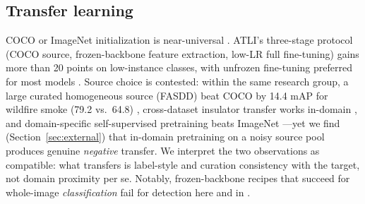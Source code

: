 \documentclass[conference]{IEEEtran}
\begin{document}
\subsection{Transfer learning}
COCO \cite{lin2014coco} or ImageNet initialization is near-universal \cite{miao2019insulator,lei2019faultdetection,qiu2022lightweightyolov4,yuan2023yolov5tl,maduako2022felect,zhao2016multipatch}. ATLI's three-stage protocol (COCO source, frozen-backbone feature extraction, low-LR full fine-tuning) gains more than 20 points on low-instance classes, with unfrozen fine-tuning preferred for most models \cite{tsai2025atli}. Source choice is contested: within the same research group, a large curated homogeneous source (FASDD) beat COCO by 14.4 mAP for wildfire smoke (79.2 vs.\ 64.8) \cite{vazquez2026wildfire,vazquez2024wildfire}, cross-dataset insulator transfer works in-domain \cite{pradeep2025insulator}, and domain-specific self-supervised pretraining beats ImageNet \cite{zhang2024hcvit}---yet we find (Section~\ref{sec:external}) that in-domain pretraining on a noisy source pool produces genuine \emph{negative} transfer. We interpret the two observations as compatible: what transfers is label-style and curation consistency with the target, not domain proximity per se. Notably, frozen-backbone recipes that succeed for whole-image \emph{classification} \cite{shakiba2022insulator} fail for detection here and in \cite{tsai2025atli}.
\end{document}
